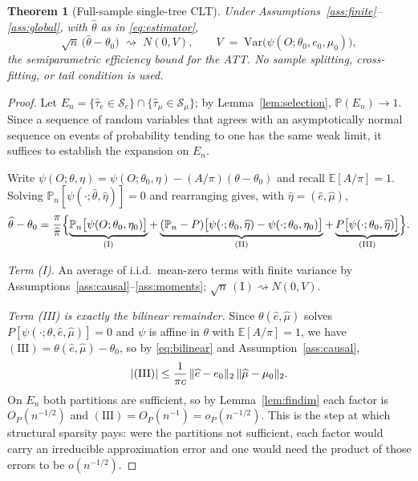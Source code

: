 \documentclass[11pt]{article}
\theoremstyle{plain}
\newtheorem{theorem}{Theorem}
\theoremstyle{definition}
\theoremstyle{remark}
\newcommand{\E}{\mathbb{E}}
\newcommand{\PP}{\mathbb{P}}
\newcommand{\Pn}{\mathbb{P}_n}
\newcommand{\cS}{\mathcal{S}}
\newcommand{\ez}{e_0}
\newcommand{\mz}{\mu_0}
\newcommand{\ehat}{\widehat{e}}
\newcommand{\mhat}{\widehat{\mu}}
\newcommand{\that}{\widehat{\tau}}
\newcommand{\thetahat}{\widehat{\theta}}
\newcommand{\Ltwo}[1]{\lVert #1 \rVert_{2}}
\DeclarePairedDelimiter{\abs}{\lvert}{\rvert}
\begin{document}
\begin{theorem}[Full-sample single-tree CLT]\label{thm:main}
Under Assumptions~\ref{ass:finite}--\ref{ass:global}, with $\thetahat$ as in
\eqref{eq:estimator},
\[
  \sqrt n\,\bigl(\thetahat-\theta_0\bigr)\;\rightsquigarrow\;N(0,V),
  \qquad
  V \;=\; \mathrm{Var}\bigl(\psi(O;\theta_0,\ez,\mz)\bigr),
\]
the semiparametric efficiency bound for the ATT. No sample splitting,
cross-fitting, or tail condition is used.
\end{theorem}

\begin{proof}
Let $E_n=\{\that_e\in\cS_e\}\cap\{\that_\mu\in\cS_\mu\}$; by
Lemma~\ref{lem:selection}, $\PP(E_n)\to1$. Since a sequence of random variables
that agrees with an asymptotically normal sequence on events of probability
tending to one has the same weak limit, it suffices to establish the expansion on
$E_n$.

Write $\psi(O;\theta,\eta) = \psi(O;\theta_0,\eta) - (A/\pi)(\theta-\theta_0)$
and recall $\E[A/\pi]=1$. Solving $\Pn[\psi(\cdot;\thetahat,\widehat\eta)]=0$ and
rearranging gives, with $\widehat\eta=(\ehat,\mhat)$,
\begin{equation}\label{eq:decomp}
  \thetahat-\theta_0
  = \frac{\pi}{\widehat\pi}\Bigl\{
    \underbrace{\Pn\bigl[\psi(O;\theta_0,\eta_0)\bigr]}_{\mathrm{(I)}}
    + \underbrace{(\Pn-P)\bigl[\psi(\cdot;\theta_0,\widehat\eta)-\psi(\cdot;\theta_0,\eta_0)\bigr]}_{\mathrm{(II)}}
    + \underbrace{P\bigl[\psi(\cdot;\theta_0,\widehat\eta)\bigr]}_{\mathrm{(III)}}
    \Bigr\}.
\end{equation}

\emph{Term (I).} An average of i.i.d.\ mean-zero terms with finite variance by
Assumptions~\ref{ass:causal}--\ref{ass:moments}; $\sqrt n\,\mathrm{(I)}
\rightsquigarrow N(0,V)$.

\emph{Term (III) is exactly the bilinear remainder.} Since $\theta(\ehat,\mhat)$
solves $P[\psi(\cdot;\theta,\ehat,\mhat)]=0$ and $\psi$ is affine in $\theta$
with $\E[A/\pi]=1$, we have $\mathrm{(III)}=\theta(\ehat,\mhat)-\theta_0$, so by
\eqref{eq:bilinear} and Assumption~\ref{ass:causal},
\[
  \abs{\mathrm{(III)}}
  \le \frac{1}{\pi c}\,\Ltwo{\ehat-\ez}\,\Ltwo{\mhat-\mz}.
\]
On $E_n$ both partitions are sufficient, so by Lemma~\ref{lem:findim} each factor
is $O_P(n^{-1/2})$ and $\mathrm{(III)}=O_P(n^{-1})=o_P(n^{-1/2})$. This is the
step at which structural sparsity pays: were the partitions not sufficient, each
factor would carry an irreducible approximation error and one would need the
product of those errors to be $o(n^{-1/2})$.


\end{proof}
\end{document}
